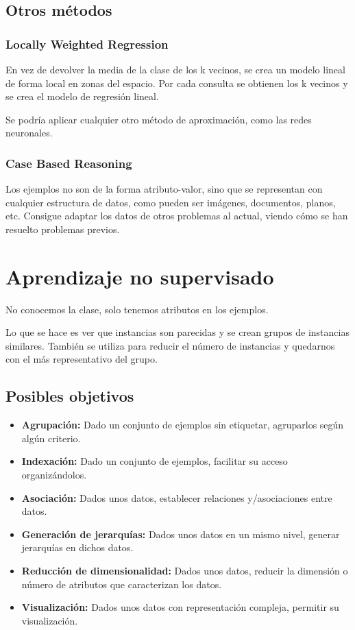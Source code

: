 \documentclass[12pt]{report} %
\begin{document}
\subsection{Otros métodos}
\subsubsection{Locally Weighted Regression}
En vez de devolver la media de la clase de los k vecinos, se crea un modelo lineal de forma local en zonas del espacio. Por cada consulta se obtienen los k vecinos y se crea el modelo de regresión lineal.

Se podría aplicar cualquier otro método de aproximación, como las redes neuronales.
\subsubsection{Case Based Reasoning}
Los ejemplos no son de la forma atributo-valor, sino que se representan con cualquier estructura de datos, como pueden ser imágenes, documentos, planos, etc. Consigue adaptar los datos de otros problemas al actual, viendo cómo se han resuelto problemas previos.

\section{Aprendizaje no supervisado}
No conocemos la clase, solo tenemos atributos en los ejemplos.

Lo que se hace es ver que instancias son parecidas y se crean grupos de instancias similares. También se utiliza para reducir el número de instancias y quedarnos con el más representativo del grupo.

\subsection{Posibles objetivos}
\begin{itemize}
  \item \textbf{Agrupación:} Dado un conjunto de ejemplos sin etiquetar, agruparlos según algún criterio.
  \item \textbf{Indexación:} Dado un conjunto de ejemplos, facilitar su acceso organizándolos.
  \item \textbf{Asociación:} Dados unos datos, establecer relaciones y/asociaciones entre datos.
  \item \textbf{Generación de jerarquías:} Dados unos datos en un mismo nivel, generar jerarquías en dichos datos.
  \item \textbf{Reducción de dimensionalidad:} Dados unos datos, reducir la dimensión o número de atributos que caracterizan los datos.
  \item \textbf{Visualización:} Dados unos datos con representación compleja, permitir su visualización.
\end{itemize}
\end{document}
